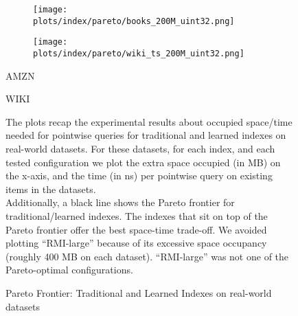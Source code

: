 \documentclass{article}
\begin{document}
\begin{figure}[!htbp]
{\begin{minipage}[t][0.98\textheight][t]{\textwidth}
    \begin{minipage}{0.48\linewidth}
        \begin{figure}[H]
        \texttt{[image: plots/index/pareto/books\_200M\_uint32.png]}
        \end{figure}
    \end{minipage}
    \begin{minipage}{0.48\linewidth}
        \begin{figure}[H]
        \texttt{[image: plots/index/pareto/wiki\_ts\_200M\_uint32.png]}
        \end{figure}
    \end{minipage}
    \begin{minipage}{0.48\linewidth}
    \begin{center}
        AMZN
    \end{center}
    \end{minipage}
    \begin{minipage}{0.48\linewidth}
    \begin{center}
        WIKI
    \end{center}
    \end{minipage}

    \vspace{20px}
    
    \begin{minipage}{\linewidth}
    The plots recap the experimental results about occupied space/time needed for pointwise queries for traditional and learned indexes on real-world datasets. For these datasets, for each index, and each tested configuration we plot the extra space occupied (in MB) on the x-axis, and the time (in ns) per pointwise query on existing items in the datasets. \\

    Additionally, a black line shows the Pareto frontier for traditional/learned indexes. The indexes that sit on top of the Pareto frontier offer the best space-time trade-off.  
    We avoided plotting ``RMI-large'' because of its excessive space occupancy (roughly 400 MB on each dataset). ``RMI-large'' was not one of the Pareto-optimal configurations.
    \end{minipage}
    \vspace{10px}
\end{minipage}
}
\caption{Pareto Frontier: Traditional and Learned Indexes on real-world datasets}
\end{figure}
\end{document}

